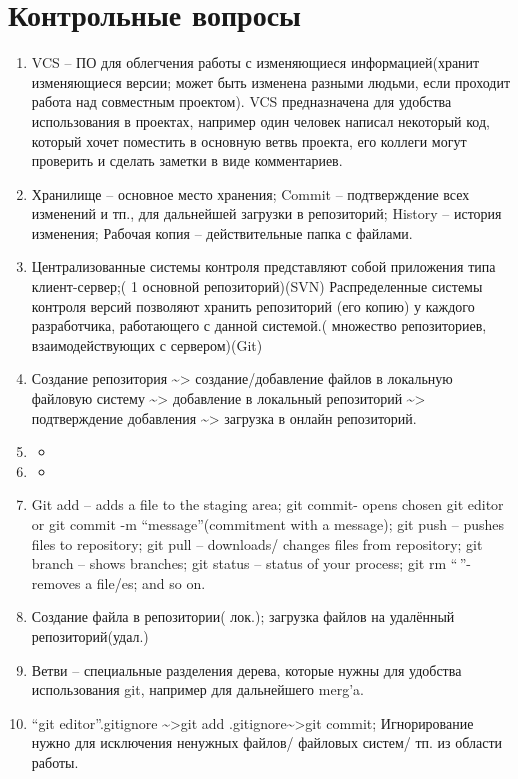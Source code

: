 \hypertarget{ux43aux43eux43dux442ux440ux43eux43bux44cux43dux44bux435-ux432ux43eux43fux440ux43eux441ux44b}{%
\section{Контрольные
вопросы}\label{ux43aux43eux43dux442ux440ux43eux43bux44cux43dux44bux435-ux432ux43eux43fux440ux43eux441ux44b}}

\begin{enumerate}
\def\labelenumi{\arabic{enumi}.}
\item
  VCS -- ПО для облегчения работы с изменяющиеся информацией(хранит
  изменяющиеся версии; может быть изменена разными людьми, если проходит
  работа над совместным проектом). VCS предназначена для удобства
  использования в проектах, например один человек написал некоторый код,
  который хочет поместить в основную ветвь проекта, его коллеги могут
  проверить и сделать заметки в виде комментариев.
\item
  Хранилище -- основное место хранения; Commit -- подтверждение всех
  изменений и тп., для дальнейшей загрузки в репозиторий; History --
  история изменения; Рабочая копия -- действительные папка с файлами.
\item
  Централизованные системы контроля представляют собой приложения типа
  клиент-сервер;( 1 основной репозиторий)(SVN) Распределенные системы
  контроля версий позволяют хранить репозиторий (его копию) у каждого
  разработчика, работающего с данной системой.( множество репозиториев,
  взаимодействующих с сервером)(Git)
\item
  Создание репозитория \textasciitilde\textgreater{} создание/добавление
  файлов в локальную файловую систему \textasciitilde\textgreater{}
  добавление в локальный репозиторий \textasciitilde\textgreater{}
  подтверждение добавления \textasciitilde\textgreater{} загрузка в
  онлайн репозиторий.
\item
  \begin{itemize}
  \tightlist
  \item
  \end{itemize}
\item
  \begin{itemize}
  \tightlist
  \item
  \end{itemize}
\item
  Git add -- adds a file to the staging area; git commit- opens chosen
  git editor or git commit -m ``message''(commitment with a message);
  git push -- pushes files to repository; git pull -- downloads/ changes
  files from repository; git branch -- shows branches; git status --
  status of your process; git rm ``\,''- removes a file/es; and so on.
\item
  Создание файла в репозитории( лок.); загрузка файлов на удалённый
  репозиторий(удал.)
\item
  Ветви -- специальные разделения дерева, которые нужны для удобства
  использования git, например для дальнейшего merg'a.
\item
  ``git editor''.gitignore \textasciitilde\textgreater git add
  .gitignore\textasciitilde\textgreater git commit; Игнорирование нужно
  для исключения ненужных файлов/ файловых систем/ тп. из области
  работы.
\end{enumerate}
